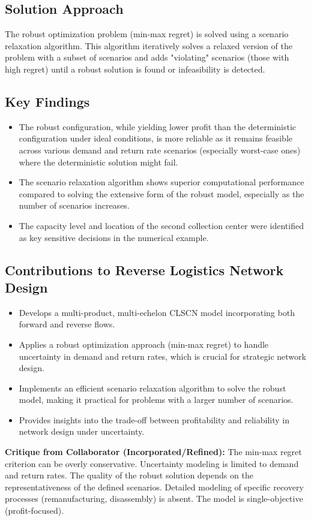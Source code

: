 \subsection*{Solution Approach}
The robust optimization problem (min-max regret) is solved using a scenario relaxation algorithm. This algorithm iteratively solves a relaxed version of the problem with a subset of scenarios and adds "violating" scenarios (those with high regret) until a robust solution is found or infeasibility is detected.

\subsection*{Key Findings}
\begin{itemize}
    \item The robust configuration, while yielding lower profit than the deterministic configuration under ideal conditions, is more reliable as it remains feasible across various demand and return rate scenarios (especially worst-case ones) where the deterministic solution might fail.
    \item The scenario relaxation algorithm shows superior computational performance compared to solving the extensive form of the robust model, especially as the number of scenarios increases.
    \item The capacity level and location of the second collection center were identified as key sensitive decisions in the numerical example.
\end{itemize}

\subsection*{Contributions to Reverse Logistics Network Design}
\begin{itemize}
    \item Develops a multi-product, multi-echelon CLSCN model incorporating both forward and reverse flows.
    \item Applies a robust optimization approach (min-max regret) to handle uncertainty in demand and return rates, which is crucial for strategic network design.
    \item Implements an efficient scenario relaxation algorithm to solve the robust model, making it practical for problems with a larger number of scenarios.
    \item Provides insights into the trade-off between profitability and reliability in network design under uncertainty.
\end{itemize}
\textbf{Critique from Collaborator (Incorporated/Refined):} The min-max regret criterion can be overly conservative. Uncertainty modeling is limited to demand and return rates. The quality of the robust solution depends on the representativeness of the defined scenarios. Detailed modeling of specific recovery processes (remanufacturing, disassembly) is absent. The model is single-objective (profit-focused).